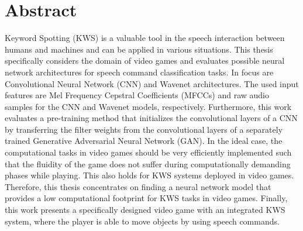 
\chapter*{Abstract}\label{sec:shards_abstract}
Keyword Spotting (KWS) is a valuable tool in the speech interaction between humans and machines and can be applied in various situations.
This thesis specifically considers the domain of video games and evaluates possible neural network architectures for speech command classification tasks.
In focus are Convolutional Neural Network (CNN) and Wavenet architectures.
The used input features are Mel Frequency Cepstral Coefficients (MFCCs) and raw audio samples for the CNN and Wavenet models, respectively.
Furthermore, this work evaluates a pre-training method that initializes the convolutional layers of a CNN by transferring the filter weights from the convolutional layers of a separately trained Generative Adversarial Neural Network (GAN).
In the ideal case, the computational tasks in video games should be very efficiently implemented such that the fluidity of the game does not suffer during computationally demanding phases while playing.
This also holds for KWS systems deployed in video games.
Therefore, this thesis concentrates on finding a neural network model that provides a low computational footprint for KWS tasks in video games.
Finally, this work presents a specifically designed video game with an integrated KWS system, where the player is able to move objects by using speech commands.



